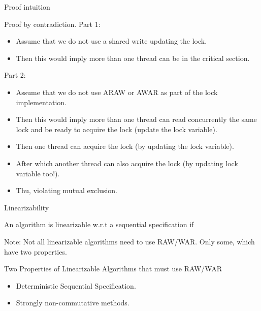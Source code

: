 \documentclass[notes, xcolor=dvipsnames]{beamer}
\begin{document}
    \begin{frame}{Proof intuition}

        Proof by contradiction.
        Part 1:
        \begin{itemize}
            \item Assume that we do not use a shared write updating the lock. 
            \item Then this would imply more than one thread can be in the critical section. 
        \end{itemize}

        Part 2:
        \begin{itemize}
            \item Assume that we do not use ARAW or AWAR as part of the lock implementation. 
            \item Then this would imply more than one thread can read concurrently the same lock and be ready to acquire the lock (update the lock variable).
            \item Then one thread can acquire the lock (by updating the lock variable). 
            \item After which another thread can also acquire the lock (by updating lock variable too!). 
            \item Thu, violating mutual exclusion.
        \end{itemize}

    \end{frame}

    \begin{frame}{Linearizability}

        An algorithm is linearizable w.r.t a sequential specification if
        
        Note: Not all linearizable algorithms need to use RAW/WAR. Only some, which have two properties.

    \end{frame}

    \begin{frame}{Two Properties of Linearizable Algorithms that must use RAW/WAR}
        
        \begin{itemize}
            \item Deterministic Sequential Specification.
            \item Strongly non-commutative methods.
        \end{itemize}

    \end{frame}
\end{document}
